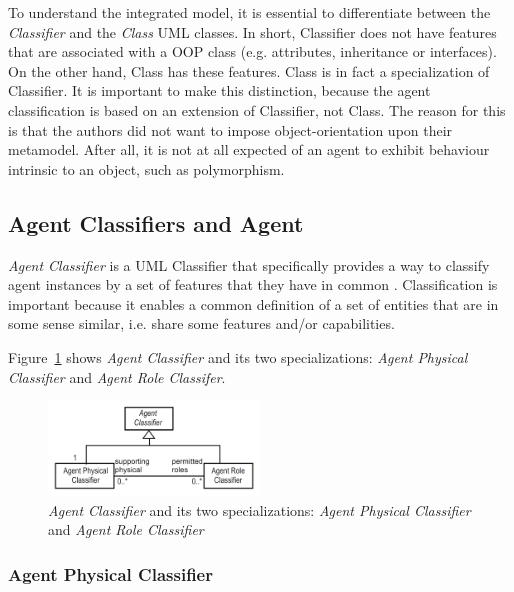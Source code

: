 To understand the integrated model, it is essential to differentiate between the \textit{Classifier} and the \textit{Class} UML classes.
In short, Classifier does not have features that are associated with a OOP class (e.g. attributes, inheritance or interfaces).
On the other hand, Class has these features.
Class is in fact a specialization of Classifier.
It is important to make this distinction, because the agent classification is based on an extension of Classifier, not Class.
The reason for this is that the authors did not want to impose object-orientation upon their metamodel.
After all, it is not at all expected of an agent to exhibit behaviour intrinsic to an object, such as polymorphism. 

\subsection{Agent Classifiers and Agent}

\textit{Agent Classifier} is a UML Classifier that specifically provides a way to classify agent instances by a set of features that they have in common \cite{Odell05}.
Classification is important because it enables a common definition of a set of entities that are in some sense similar, i.e. share some features and/or capabilities.

Figure~\ref{figure:onp-agent-classifiers} shows \textit{Agent Classifier} and its two specializations: \textit{Agent Physical Classifier} and \textit{Agent Role Classifer}.

\begin{figure}[ht]
	\centering
	\includegraphics[width=0.5\textwidth]{images/onp/agent-classifiers.png}
	\caption{\textit{Agent Classifier} and its two specializations: \textit{Agent Physical Classifier} and \textit{Agent Role Classifier}}
	\label{figure:onp-agent-classifiers}
\end{figure}

\subsubsection*{Agent Physical Classifier}

